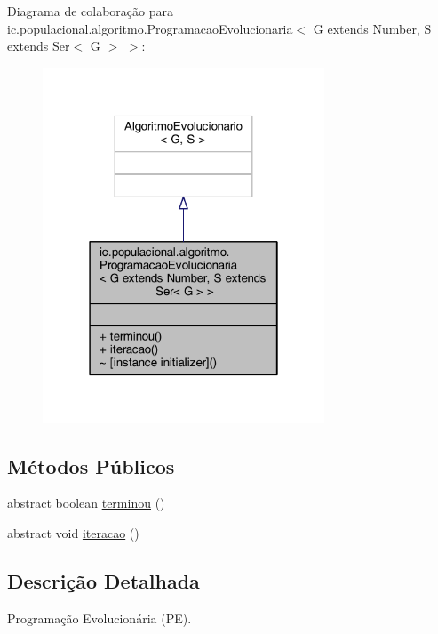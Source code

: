Diagrama de colaboração para ic.\-populacional.\-algoritmo.\-Programacao\-Evolucionaria$<$ G extends Number, S extends Ser$<$ G $>$ $>$\-:\nopagebreak
\begin{figure}[H]
\begin{center}
\leavevmode
\includegraphics[width=238pt]{classic_1_1populacional_1_1algoritmo_1_1_programacao_evolucionaria_3_01_g_01extends_01_number_00f0c36e7e47acd8a1533e18a77fe4b239}
\end{center}
\end{figure}
\subsection*{Métodos Públicos}
\begin{DoxyCompactItemize}
\item 
abstract boolean \hyperlink{classic_1_1populacional_1_1algoritmo_1_1_programacao_evolucionaria_3_01_g_01extends_01_number_00132d0159107691234e2d806b9bd9cb38_af0fd198f386f36635320781f3f37f5f3}{terminou} ()
\item 
abstract void \hyperlink{classic_1_1populacional_1_1algoritmo_1_1_programacao_evolucionaria_3_01_g_01extends_01_number_00132d0159107691234e2d806b9bd9cb38_a14c89d23d623006b8385166c8ebfa960}{iteracao} ()
\end{DoxyCompactItemize}


\subsection{Descrição Detalhada}
Programação Evolucionária (P\-E). 

